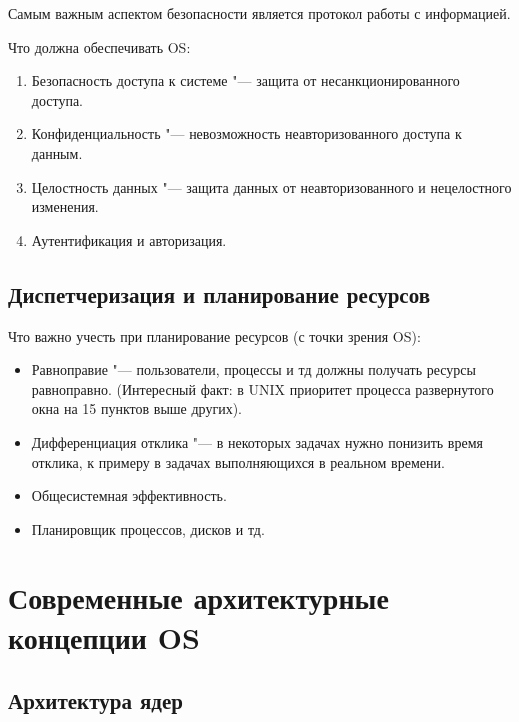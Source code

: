 \documentclass[bachelor, och, pract]{SCWorks}
\theoremstyle{remark}
\begin{document}
    Самым важным аспектом безопасности является протокол работы с информацией.

    Что должна обеспечивать OS:

    \begin{enumerate}
        \item Безопасность доступа к системе "--- защита от несанкционированного доступа.
        \item Конфиденциальность "--- невозможность неавторизованного доступа к данным.
        \item Целостность данных "--- защита данных от неавторизованного и нецелостного изменения.
        \item Аутентификация и авторизация.
    \end{enumerate}

    \subsection{Диспетчеризация и планирование ресурсов}

    Что важно учесть при планирование ресурсов (с точки зрения OS):

    \begin{itemize}[label=$\bullet$]
        \item Равноправие "--- пользователи, процессы и тд должны получать ресурсы равноправно. (Интересный факт: в UNIX приоритет процесса развернутого окна на 15 пунктов выше других).
        \item Дифференциация отклика "--- в некоторых задачах нужно понизить время отклика, к примеру в задачах выполняющихся в реальном времени.
        \item Общесистемная эффективность.
        \item Планировщик процессов, дисков и тд.
    \end{itemize}


    \section{Современные архитектурные концепции OS}

    \subsection{Архитектура ядер}
\end{document}
